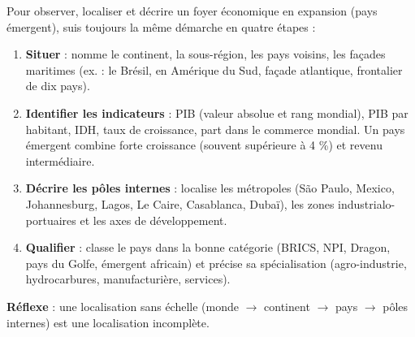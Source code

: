\documentclass[11pt]{article}
\begin{document}
\begin{methode}
Pour observer, localiser et décrire un foyer économique en expansion (pays émergent), suis toujours la même démarche en quatre étapes :
\begin{enumerate}
\item \textbf{Situer} : nomme le continent, la sous-région, les pays voisins, les façades maritimes (ex. : le Brésil, en Amérique du Sud, façade atlantique, frontalier de dix pays).
\item \textbf{Identifier les indicateurs} : PIB (valeur absolue et rang mondial), PIB par habitant, IDH, taux de croissance, part dans le commerce mondial. Un pays émergent combine forte croissance (souvent supérieure à 4 \%) et revenu intermédiaire.
\item \textbf{Décrire les pôles internes} : localise les métropoles (São Paulo, Mexico, Johannesburg, Lagos, Le Caire, Casablanca, Dubaï), les zones industrialo-portuaires et les axes de développement.
\item \textbf{Qualifier} : classe le pays dans la bonne catégorie (BRICS, NPI, Dragon, pays du Golfe, émergent africain) et précise sa spécialisation (agro-industrie, hydrocarbures, manufacturière, services).
\end{enumerate}
\textbf{Réflexe} : une localisation sans échelle (monde $\rightarrow$ continent $\rightarrow$ pays $\rightarrow$ pôles internes) est une localisation incomplète.
\end{methode}
\end{document}
